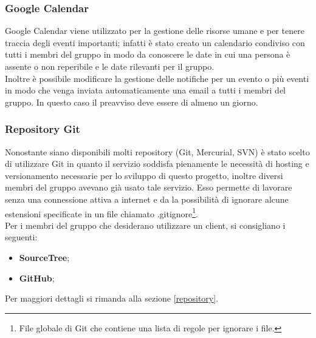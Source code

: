 \subsubsection{Google Calendar}
\gls{Google Calendar} viene utilizzato per la gestione delle risorse umane e per tenere traccia degli eventi importanti; infatti è stato creato un calendario condiviso con tutti i membri del gruppo in modo da conoscere le date in cui una persona è assente o non reperibile e le date rilevanti per il gruppo.\\
Inoltre è possibile modificare la gestione delle notifiche per un evento o più eventi in modo che venga inviata automaticamente una email a tutti i membri del gruppo. In questo caso il preavviso deve essere di almeno un giorno.

\subsubsection{Repository Git}

Nonostante siano disponibili molti \gls{repository} (\gls{Git}, \gls{Mercurial}, \gls{SVN}) è stato scelto di utilizzare \gls{Git} in quanto il servizio soddisfa pienamente le necessità di \gls{hosting} e \gls{versionamento} necessarie per lo sviluppo di questo progetto, inoltre diversi membri del gruppo avevano già usato tale servizio. Esso permette di lavorare senza una connessione attiva a internet e da la possibilità di ignorare alcune estensioni specificate in un file chiamato .gitignore\footnote{File globale di \gls{Git} che contiene una lista di regole per ignorare i file.}.\\ Per i membri del gruppo che desiderano utilizzare un client, si consigliano i seguenti:
\begin{itemize}
	\item \textbf{SourceTree};
	\item \textbf{\gls{GitHub}};
\end{itemize}
Per maggiori dettagli si rimanda alla sezione \ref{repository}.

\newpage
